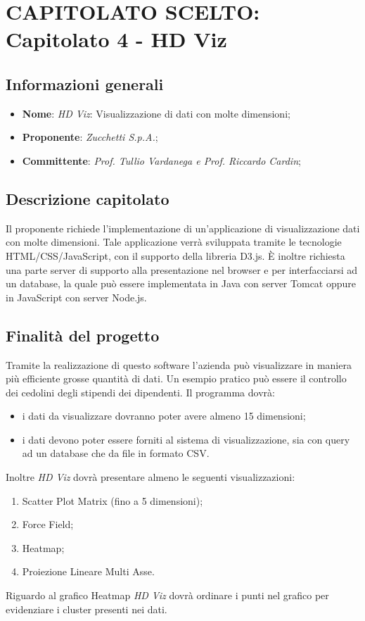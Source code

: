 \section{CAPITOLATO SCELTO: Capitolato 4 - HD Viz}
\subsection{Informazioni generali}
\begin{itemize}
    \item \textbf{Nome}: \emph{HD Viz}: Visualizzazione di dati con molte dimensioni;
    \item \textbf{Proponente}: \emph{Zucchetti S.p.A.};
    \item \textbf{Committente}: \emph{Prof. Tullio Vardanega e Prof. Riccardo Cardin};
\end{itemize}
\subsection{Descrizione capitolato}
Il proponente richiede l'implementazione di un'applicazione di visualizzazione dati con molte dimensioni. Tale applicazione verrà sviluppata tramite le tecnologie HTML/CSS/JavaScript, con il supporto della libreria D3.js. È inoltre richiesta una parte server di supporto alla presentazione nel browser e per interfacciarsi ad un  database, la quale può essere implementata in Java con server Tomcat oppure in JavaScript con server Node.js.
\subsection{Finalità del progetto}
Tramite la realizzazione di questo software l'azienda può visualizzare in maniera più efficiente grosse quantità di dati. Un esempio pratico può essere il controllo dei cedolini degli stipendi dei dipendenti. Il programma dovrà:
\begin{itemize}
    \item i dati da visualizzare dovranno poter avere almeno 15 dimensioni;
    \item i dati devono poter essere forniti al sistema di visualizzazione, sia con query ad un database che da file in formato CSV.
\end{itemize}
Inoltre \emph{HD Viz} dovrà presentare almeno le seguenti visualizzazioni:
\begin{enumerate}
	\item Scatter Plot Matrix (fino a 5 dimensioni);
	\item Force Field;
	\item Heatmap;
	\item Proiezione Lineare Multi Asse.
\end{enumerate}
Riguardo al grafico Heatmap  \emph{HD Viz} dovrà ordinare i punti nel grafico per evidenziare i cluster presenti nei dati.

